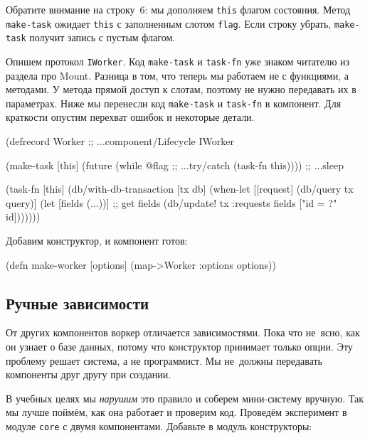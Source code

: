 Обратите внимание на строку~6: мы дополняем \verb|this| флагом
состояния. Метод \verb|make-task| ожидает \verb|this| с заполненным слотом
\verb|flag|. Если строку убрать, \verb|make-task| получит запись с пустым
флагом.


Опишем протокол \verb|IWorker|. Код \verb|make-task| и \verb|task-fn| уже
знаком читателю из раздела про Mount. Разница в том, что теперь мы работаем не с
функциями, а методами. У метода прямой доступ к слотам, поэтому не нужно
передавать их в параметрах. Ниже мы перенесли код \verb|make-task| и
\verb|task-fn| в компонент. Для краткости опустим перехват ошибок и некоторые
детали.

\begin{english}
  \begin{clojure}
(defrecord Worker
  ;; ...component/Lifecycle
  IWorker

  (make-task [this]
    (future
      (while @flag        ;; ...try/catch
        (task-fn this)))) ;; ...sleep

  (task-fn [this]
    (db/with-db-transaction [tx db]
      (when-let [[request] (db/query tx query)]
        (let [fields (...))] ;; get fields
          (db/update! tx :requests
                      fields ["id = ?" id]))))))
  \end{clojure}
\end{english}

\noindent
Добавим конструктор, и компонент готов:


\begin{english}
  \begin{clojure}
(defn make-worker
  [options]
  (map->Worker {:options options}))
  \end{clojure}
\end{english}

\subsection{Ручные зависимости}


От других компонентов воркер отличается зависимостями. Пока что не~ясно, как
он узнает о базе данных, потому что конструктор принимает только опции. Эту
проблему решает система, а не программист. Мы не~должны передавать компоненты
друг другу при создании.

В учебных целях мы \emph{нарушим} это правило и соберем мини-систему
вручную. Так мы лучше поймём, как она работает и проверим код. Проведём
эксперимент в модуле \verb|core| с двумя компонентами. Добавьте в модуль
конструкторы:

